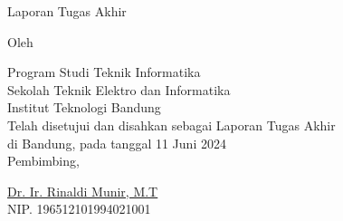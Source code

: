 \clearpage
\pagestyle{empty}

\begin{center}
    \smallskip

    \Large \bfseries \MakeUppercase{\thetitle}
    \vfill

    \Large Laporan Tugas Akhir
    \vfill

    \large Oleh

    \Large \theauthor

    \large Program Studi Teknik Informatika \\

    \normalsize \normalfont
    Sekolah Teknik Elektro dan Informatika \\
    Institut Teknologi Bandung \\

    \vfill
    \normalsize \normalfont
    Telah disetujui dan disahkan sebagai Laporan Tugas Akhir \\
    di Bandung, pada tanggal 11 Juni 2024 \\

    \vspace{0.3cm}
    Pembimbing,

    \vspace{2cm}
    \underline{{{Dr. Ir. Rinaldi Munir, M.T}}} \\
    NIP. {{196512101994021001}}

\end{center}
\clearpage
